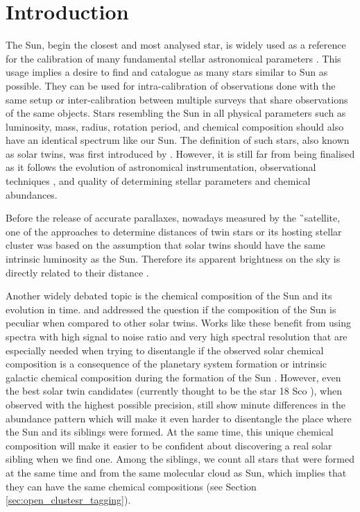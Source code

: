 \section{Introduction}
\label{sec:intro_solar}
The Sun, begin the closest and most analysed star, is widely used as a reference for the calibration of many fundamental stellar astronomical parameters \cite{2010A&A...522A..98M, 2012MNRAS.426..484D}. This usage implies a desire to find and catalogue as many stars similar to Sun as possible. They can be used for intra-calibration of observations done with the same setup or inter-calibration between multiple surveys that share observations of the same objects. Stars resembling the Sun in all physical parameters such as luminosity, mass, radius, rotation period, and chemical composition should also have an identical spectrum like our Sun. The definition of such stars, also known as solar twins, was first introduced by \citet{1981A&A....94....1C}. However, it is still far from being finalised as it follows the evolution of astronomical instrumentation, observational techniques \cite{2017AN....338..442A}, and quality of determining stellar parameters and chemical abundances.

Before the release of accurate parallaxes, nowadays measured by the \G\ satellite, one of the approaches to determine distances of twin stars or its hosting stellar cluster was based on the assumption that solar twins should have the same intrinsic luminosity as the Sun. Therefore its apparent brightness on the sky is directly related to their distance \cite{2015MNRAS.453.1428J, 2016A&A...595A..59M, 2017MNRAS.472.2517J}.

Another widely debated topic is the chemical composition of the Sun and its evolution in time. \citet{2009A&A...508L..17R} and \citet{2015A&A...579A..52N} addressed the question if the composition of the Sun is peculiar when compared to other solar twins. Works like these benefit from using spectra with high signal to noise ratio and very high spectral resolution that are especially needed when trying to disentangle if the observed solar chemical composition is a consequence of the planetary system formation \cite{2014A&A...572A..48R} or intrinsic galactic chemical composition during the formation of the Sun \cite{2015A&A...579A..52N, 2016A&A...593A..65N, 2020A&A...633L...9J}. However, even the best solar twin candidates (currently thought to be the star 18 Sco \cite{2014ApJ...791...14M}), when observed with the highest possible precision, still show minute differences in the abundance pattern which will make it even harder to disentangle the place where the Sun and its siblings were formed. At the same time, this unique chemical composition will make it easier to be confident about discovering a real solar sibling when we find one. Among the siblings, we count all stars that were formed at the same time and from the same molecular cloud as Sun, which implies that they can have the same chemical compositions (see Section \ref{sec:open_clustesr_tagging}).

